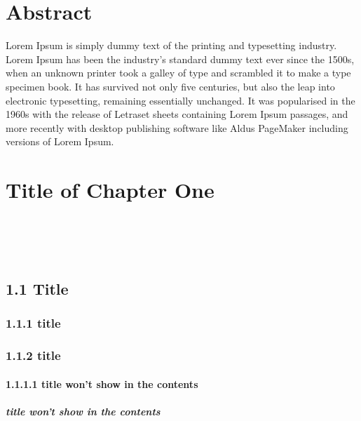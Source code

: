 \documentclass[a4paper,12pt,UTF8,openright]{book}
\begin{document}
\chapter*{Abstract}

Lorem Ipsum is simply dummy text of the printing and typesetting industry. Lorem Ipsum has been the industry's standard dummy text ever since the 1500s, when an unknown printer took a galley of type and scrambled it to make a type specimen book. It has survived not only five centuries, but also the leap into electronic typesetting, remaining essentially unchanged. It was popularised in the 1960s with the release of Letraset sheets containing Lorem Ipsum passages, and more recently with desktop publishing software like Aldus PageMaker including versions of Lorem Ipsum.~\cite{Weir04}

\mainmatter
\chapter{Title of Chapter One}

 \\
 \\
 \\

\lipsum[1-5]

\section{1.1 Title}
\lipsum[1-10]

\subsection{1.1.1 title}
\lipsum[1-5]

\subsection{1.1.2 title}
\lipsum[1-5]

\subsubsection{1.1.1.1 title won't show in the contents}
\lipsum[1-5]

\paragraph{title won't show in the contents}
\lipsum[1-5]
\end{document}
